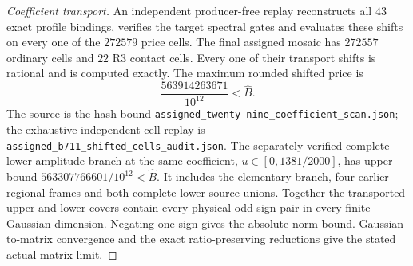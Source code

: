 \begin{proof}[Coefficient transport]
An independent producer-free replay reconstructs all $43$ exact
profile bindings, verifies the target spectral gates and evaluates
these shifts on every one of the $272579$ price cells. The final assigned mosaic has $272557$ ordinary cells and $22$ R3
contact cells. Every one of their transport shifts is rational and is
computed exactly. The maximum rounded shifted price is
\[
 \frac{563914263671}{10^{12}}<\widehat B.
\]
The source is the hash-bound
\texttt{assigned\_\allowbreak twenty-nine\_\allowbreak coefficient\_\allowbreak scan.json};
the exhaustive independent cell replay is
\texttt{assigned\_\allowbreak b711\_\allowbreak shifted\_\allowbreak cells\_\allowbreak audit.json}.
The separately verified complete lower-amplitude branch at the same
coefficient, $u\in[0,1381/2000]$, has upper bound
$563307766601/10^{12}<\widehat B$. It includes the elementary branch,
four earlier regional frames and both complete lower source unions.
Together the transported upper and lower covers contain every physical
odd sign pair in every finite Gaussian dimension. Negating one sign
gives the absolute norm bound. Gaussian-to-matrix convergence and the
exact ratio-preserving reductions give the stated actual matrix limit.
\end{proof}
